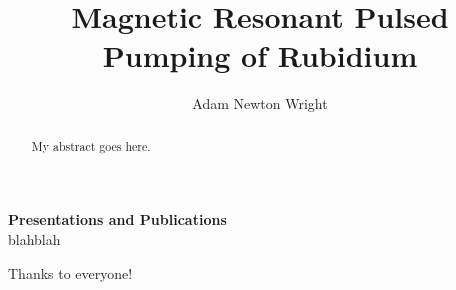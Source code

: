 \documentclass[12pt]{report}
\begin{document}
\title{Magnetic Resonant Pulsed Pumping of Rubidium}
\author{Adam Newton Wright}

\maketitle


\newpage

\begin{center}
\textbf{Presentations and Publications}\\
blahblah
\end{center}



\begin{acknowledgments}
Thanks to everyone!
\end{acknowledgments}

\begin{abstract}
My abstract goes here.
\end{abstract}

\tableofcontents
\listoftables
\listoffigures

\pagebreak
\cite{LukinZoller2001}



%



\appendix
%
\end{document}
